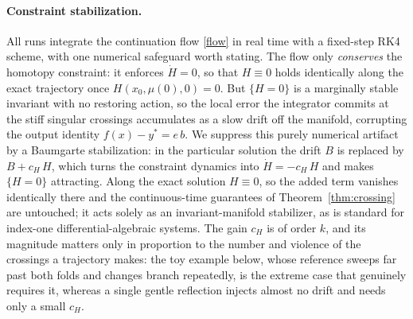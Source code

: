 \documentclass[11pt,american]{article}
\theoremstyle{definition}
\theoremstyle{plain}
\theoremstyle{remark}
\begin{document}
\paragraph{Constraint stabilization.} All runs integrate the continuation flow \eqref{flow} in real time with a fixed-step RK4 scheme, with one numerical safeguard worth stating. The flow only \emph{conserves} the homotopy constraint: it enforces $\dot H = 0$, so that $H\equiv 0$ holds identically along the exact trajectory once $H(x_0,\mu(0),0)=0$. But $\{H=0\}$ is a marginally stable invariant with no restoring action, so the local error the integrator commits at the stiff singular crossings accumulates as a slow drift off the manifold, corrupting the output identity $f(x)-y^* = e\,b$. We suppress this purely numerical artifact by a Baumgarte stabilization: in the particular solution the drift $B$ is replaced by $B + c_H\,H$, which turns the constraint dynamics into $\dot H = -c_H\,H$ and makes $\{H=0\}$ attracting. Along the exact solution $H\equiv 0$, so the added term vanishes identically there and the continuous-time guarantees of Theorem~\ref{thm:crossing} are untouched; it acts solely as an invariant-manifold stabilizer, as is standard for index-one differential-algebraic systems. The gain $c_H$ is of order $k$, and its magnitude matters only in proportion to the number and violence of the crossings a trajectory makes: the toy example below, whose reference sweeps far past both folds and changes branch repeatedly, is the extreme case that genuinely requires it, whereas a single gentle reflection injects almost no drift and needs only a small $c_H$.
\end{document}
